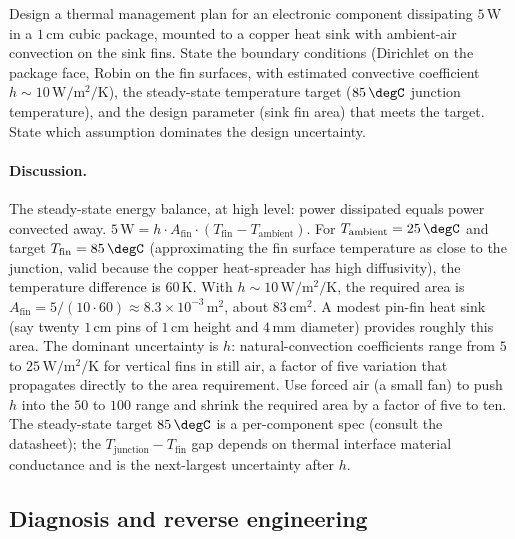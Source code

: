 \begin{exercise}
Design a thermal management plan for an electronic component
dissipating $5\,\si{\watt}$ in a $1\,\si{\centi\meter}$ cubic
package, mounted to a copper heat sink with ambient-air
convection on the sink fins. State the boundary conditions
(Dirichlet on the package face, Robin on the fin surfaces, with
estimated convective coefficient $h \sim 10\,\si{\watt\per\meter
\squared\per\kelvin}$), the steady-state temperature target ($85
\,\degC$ junction temperature), and the design parameter (sink
fin area) that meets the target. State which assumption dominates
the design uncertainty.

\paragraph{Discussion.}
The steady-state energy balance, at high level: power dissipated
equals power convected away. $5\,\si{\watt} = h \cdot A_{\text{fin}}
\cdot (T_{\text{fin}} - T_{\text{ambient}})$. For $T_{\text{ambient}}
= 25\,\degC$ and target $T_{\text{fin}} = 85\,\degC$
(approximating the fin surface temperature as close to the
junction, valid because the copper heat-spreader has high
diffusivity), the temperature difference is $60\,\si{\kelvin}$.
With $h \sim 10\,\si{\watt\per\meter\squared\per\kelvin}$, the
required area is $A_{\text{fin}} = 5/(10 \cdot 60) \approx 8.3
\times 10^{-3}\,\si{\meter\squared}$, about $83\,\si{\centi\meter
\squared}$. A modest pin-fin heat sink (say twenty $1\,\si{\centi
\meter}$ pins of $1\,\si{\centi\meter}$ height and $4\,\si{\milli
\meter}$ diameter) provides roughly this area. The dominant
uncertainty is $h$: natural-convection coefficients range from
$5$ to $25\,\si{\watt\per\meter\squared\per\kelvin}$ for vertical
fins in still air, a factor of five variation that propagates
directly to the area requirement. Use forced air (a small fan)
to push $h$ into the $50$ to $100$ range and shrink the required
area by a factor of five to ten. The steady-state target $85
\,\degC$ is a per-component spec (consult the datasheet); the
$T_{\text{junction}} - T_{\text{fin}}$ gap depends on thermal
interface material conductance and is the next-largest
uncertainty after $h$.
\end{exercise}

\subsection*{Diagnosis and reverse engineering}

